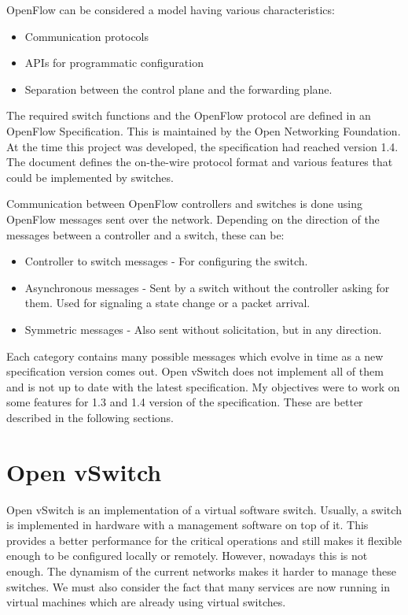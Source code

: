 OpenFlow can be considered a model\cite{sdn} having various characteristics:
\begin{itemize}
 \item Communication protocols
 \item APIs for programmatic configuration
 \item Separation between the control plane and the forwarding plane.
\end{itemize}

The required switch functions and the OpenFlow protocol are defined in an OpenFlow Specification.
This is maintained by the Open Networking Foundation\cite{onf}. At the time this project was developed, the specification
had reached version 1.4\cite{of14}. The document defines the on-the-wire protocol format and various features that could
be implemented by switches.

Communication between OpenFlow controllers and switches is done using OpenFlow messages sent over the network.
Depending on the direction of the messages between a controller and a switch, these can be:
\begin{itemize}
 \item Controller to switch messages - For configuring the switch.
 \item Asynchronous messages - Sent by a switch without the controller asking for them. Used
 for signaling a state change or a packet arrival.
 \item Symmetric messages - Also sent without solicitation, but in any direction.
\end{itemize}

Each category contains many possible messages which evolve in time as a new specification version comes out.
Open vSwitch does not implement all of them and is not up to date with the latest specification. My objectives
were to work on some features for 1.3 and 1.4 version of the specification. These are better described in the following sections.


\section{Open vSwitch}
Open vSwitch\cite{ovs} is an implementation of a virtual software switch. Usually, a switch is implemented in hardware
with a management software on top of it. This provides a better performance for the critical operations
and still makes it flexible enough to be configured locally or remotely. However, nowadays this is not
enough. The dynamism of the current networks makes it harder to manage these switches. We must also
consider the fact that many services are now running in virtual machines which are already using
virtual switches.

